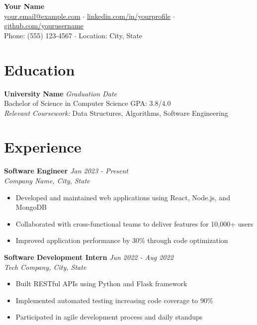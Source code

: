 \documentclass[11pt,a4paper]{article}
\begin{document}
\begin{center}
    {\LARGE \textbf{Your Name}} \\
    \vspace{2pt}
    \href{mailto:your.email@example.com}{your.email@example.com} $\cdot$ 
    \href{https://linkedin.com/in/yourprofile}{linkedin.com/in/yourprofile} $\cdot$ 
    \href{https://github.com/yourusername}{github.com/yourusername} \\
    Phone: (555) 123-4567 $\cdot$ Location: City, State
\end{center}

\vspace{10pt}

\section{Education}
\textbf{University Name} \hfill \textit{Graduation Date} \\
Bachelor of Science in Computer Science \hfill GPA: 3.8/4.0 \\
\textit{Relevant Coursework:} Data Structures, Algorithms, Software Engineering

\section{Experience}
\textbf{Software Engineer} \hfill \textit{Jan 2023 - Present} \\
\textit{Company Name, City, State}
\begin{itemize}
    \item Developed and maintained web applications using React, Node.js, and MongoDB
    \item Collaborated with cross-functional teams to deliver features for 10,000+ users
    \item Improved application performance by 30\% through code optimization
\end{itemize}

\textbf{Software Development Intern} \hfill \textit{Jun 2022 - Aug 2022} \\
\textit{Tech Company, City, State}
\begin{itemize}
    \item Built RESTful APIs using Python and Flask framework
    \item Implemented automated testing increasing code coverage to 90\%
    \item Participated in agile development process and daily standups
\end{itemize}
\end{document}
